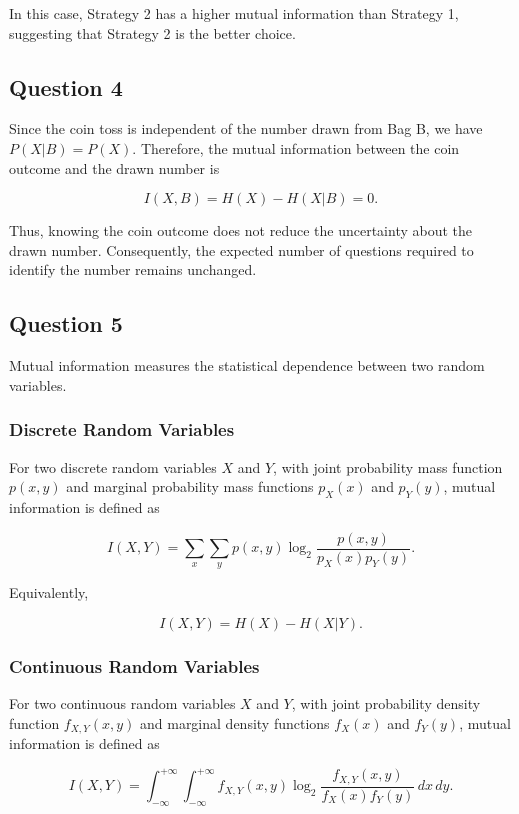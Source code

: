 \documentclass[10pt,a4paper]{article}
\begin{document}
		In this case, Strategy 2 has a higher mutual information than
		Strategy 1, suggesting that Strategy 2 is the better choice.
		\subsection{Question 4}
		Since the coin toss is independent of the number drawn from
		Bag B, we have $P(X|B)=P(X)$. Therefore, the mutual information
		between the coin outcome and the drawn number is
		
		\[
		I(X,B)=H(X)-H(X|B)=0.
		\]
		
		Thus, knowing the coin outcome does not reduce the uncertainty
		about the drawn number. Consequently, the expected number of
		questions required to identify the number remains unchanged.
		
		\subsection{Question 5}
		
		Mutual information measures the statistical dependence between
		two random variables.
		
		\subsubsection{Discrete Random Variables}
		
		For two discrete random variables $X$ and $Y$, with joint
		probability mass function $p(x,y)$ and marginal probability
		mass functions $p_X(x)$ and $p_Y(y)$, mutual information is
		defined as
		
		\[
		I(X,Y)=
		\sum_x\sum_y p(x,y)
		\log_2\frac{p(x,y)}{p_X(x)p_Y(y)}.
		\]
		
		Equivalently,
		
		\[
		I(X,Y)=H(X)-H(X|Y).
		\]
		
		\subsubsection{Continuous Random Variables}
		
		For two continuous random variables $X$ and $Y$, with joint
		probability density function $f_{X,Y}(x,y)$ and marginal
		density functions $f_X(x)$ and $f_Y(y)$, mutual information
		is defined as
		
		\[
		I(X,Y)=
		\int_{-\infty}^{+\infty}
		\int_{-\infty}^{+\infty}
		f_{X,Y}(x,y)
		\log_2
		\frac{f_{X,Y}(x,y)}
		{f_X(x)f_Y(y)}
		\,dx\,dy.
		\]
		
\end{document}
